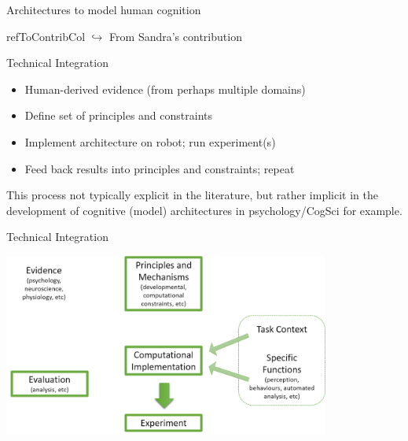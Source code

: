 \documentclass[compress]{beamer}
\newcommand{\refToContrib}[1]{%
    \begin{beamercolorbox}[wd=\linewidth,ht=2ex,dp=0.7ex]{refToContribCol}%
    \hspace{0.5em}$\hookrightarrow$ #1%
    \end{beamercolorbox}%
}%
\begin{document}
\begin{frame}{Architectures to model human cognition}
{
}

\begin{flushright}
\scriptsize \refToContrib{From Sandra's contribution}
\end{flushright}

\end{frame}


\begin{frame}{Technical Integration}    

    \begin{itemize}
        \item Human-derived evidence (from perhaps multiple domains)
        \item Define set of principles and constraints
        \item Implement architecture on robot; run experiment(s)
        \item Feed back results into principles and constraints; repeat
    \end{itemize}
    
    This process not typically explicit in the literature, but rather implicit in the development of cognitive (model) architectures in psychology/CogSci for example.

\end{frame}

\begin{frame}{Technical Integration}    

    \includegraphics[height=60mm]{cogarch-technical-integration}

\end{frame}
\end{document}
